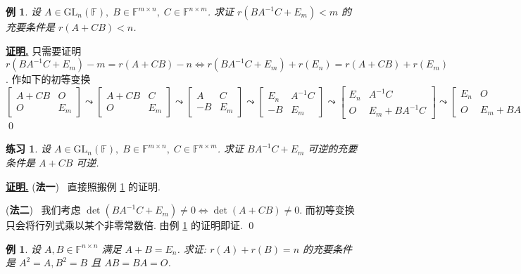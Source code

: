 \documentclass[10pt,openany]{article}
\theoremstyle{thmstyle} %
\newtheorem{practice}{练习}[section]
\theoremstyle{defstyle} %
\theoremstyle{prostyle} %
\theoremstyle{exastyle}
\newtheorem{example}[theorem]{例}
\theoremstyle{remstyle}
\renewenvironment{proof}[1][证明]{\par\underline{\textbf{#1.}} \;\fangsong}{\qed\par}
\newcommand{\F}{\mathbb{F}}
\newcommand{\gfn}{\text{GL}_n(\mathbb{F})}
\newcommand{\n}{^{n \times n}}
\newcommand{\mn}{^{m \times n}}
\newcommand{\nm}{^{n \times m}}
\begin{document}
\begin{example} \label{3.1.23}
	设 \( A \in \gfn, \; B \in \F\mn, \; C \in \F\nm \). 求证  
	\( r(BA^{-1}C + E_m) < m \) 的充要条件是 \( r(A + CB) < n \).
\end{example}

\begin{proof}
	只需要证明 \( r(BA^{-1}C+E_m)-m=r(A+CB)-n \Leftrightarrow r(BA^{-1}C+E_m)+r(E_n)=r(A+CB)+r(E_m) \). 作如下的初等变换
	\[ \begin{bmatrix}
		A+CB & O \\
		O & E_m
	\end{bmatrix} \leadsto \begin{bmatrix}
	A+CB & C \\
	O & E_m
	\end{bmatrix} \leadsto \begin{bmatrix}
	A & C \\
	-B & E_m
	\end{bmatrix} \leadsto \begin{bmatrix}
	E_n & A^{-1}C \\
	-B & E_m
	\end{bmatrix} \leadsto \begin{bmatrix}
	E_n & A^{-1}C \\
	O & E_m+BA^{-1}C
	\end{bmatrix} \leadsto \begin{bmatrix}
	E_n & O \\
	O & E_m+BA^{-1}C
	\end{bmatrix}. \]
\end{proof}

\begin{practice}
	设 \( A \in \gfn, \; B \in \F\mn, \; C \in \F\nm \). 求证  
	\( BA^{-1}C + E_m \) 可逆的充要条件是 \( A + CB \) 可逆.
\end{practice}

\begin{proof}
	(\textbf{法一}) \ 直接照搬例 \ref{3.1.23} 的证明.
	
	\vspace{1ex}
	
	(\textbf{法二}) \ 我们考虑 \( \det(BA^{-1}C + E_m) \neq 0 \Leftrightarrow \det(A + CB) \neq 0 \). 而初等变换只会将行列式乘以某个非零常数倍. 由例 \ref{3.1.23} 的证明即证.
\end{proof}

\begin{example} \label{3.1.24}
	设 \(  A, B \in \F\n \) 满足 \( A + B = E_n \). 求证: \( r(A) + r(B) = n \) 的充要条件是  
	\( A^2 = A, B^2 = B \) 且 \( AB = BA = O \).
\end{example}
\end{document}
